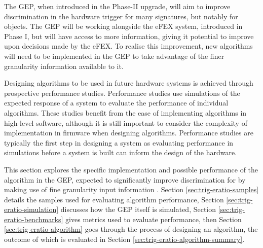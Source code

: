 
The \ac{GEP}, when introduced in the Phase-II upgrade, will aim to improve
discrimination in the hardware trigger for many signatures, but notably for
\egamma objects. The \ac{GEP} will be working alongside the \ac{eFEX} system,
introduced in Phase I, but will have access to more information, giving it
potential to improve upon decisions made by the \ac{eFEX}. To realise this
improvement, new algorithms will need to be implemented in the \ac{GEP} to take
advantage of the finer granularity information available to it.

Designing algorithms to be used in future hardware systems is achieved through
prospective performance studies. Performance studies use simulations of the
expected response of a system to evaluate the performance of individual
algorithms. These studies benefit from the ease of implementing algorithms
in high-level software, although it is still important to consider the complexity of
implementation in firmware when designing algorithms. Performance studies are
typically the first step in designing a system as evaluating performance in
simulations before a system is built can inform the design of the hardware.

This section explores the specific implementation and possible performance of
the \eratio algorithm in the \ac{GEP}, expected to significantly improve
discrimination for \egamma by making use of fine granularity input information
\cite[p.~126]{ATLAS-TDR-TDAQ-PhaseII}.
%
Section \ref{sec:trig-eratio-samples} details the samples used for evaluating
algorithm performance, Section \ref{sec:trig-eratio-simulation} discusses how
the \ac{GEP} itself is simulated, Section \ref{sec:trig-eratio-benchmarks} gives
metrics used to evaluate performance, then Section
\ref{sec:trig-eratio-algorithm} goes through the process of designing an
algorithm, the outcome of which is evaluated in Section
\ref{sec:trig-eratio-algorithm-summary}.
